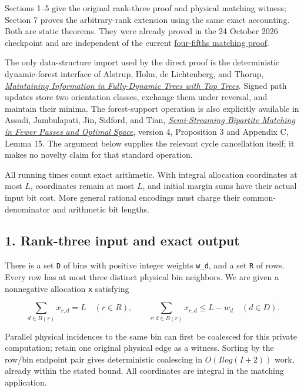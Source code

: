 Sections 1--5 give the original rank-three proof and physical matching witness; Section 7 proves the arbitrary-rank extension using the same exact accounting. Both are static theorems. They were already proved in the 24 October 2026 checkpoint and are independent of the current \href{https://github.com/icekylinx/algorithm-frontier/blob/main/problems/general-matching/proof.md}{four-fifths matching proof}.

The only data-structure import used by the direct proof is the deterministic dynamic-forest interface of Alstrup, Holm, de Lichtenberg, and Thorup, \href{https://arxiv.org/abs/cs/0310065}{\emph{Maintaining Information in Fully-Dynamic Trees with Top Trees}}. Signed path updates store two orientation classes, exchange them under reversal, and maintain their minima. The forest-support operation is also explicitly available in Assadi, Jambulapati, Jin, Sidford, and Tian, \href{https://arxiv.org/abs/2011.03495}{\emph{Semi-Streaming Bipartite Matching in Fewer Passes and Optimal Space}}, version 4, Proposition 3 and Appendix C, Lemma 15. The argument below supplies the relevant cycle cancellation itself; it makes no novelty claim for that standard operation.

All running times count exact arithmetic. With integral allocation coordinates at most \(L\), coordinates remain at most \(L\), and initial margin sums have their actual input bit cost. More general rational encodings must charge their common-denominator and arithmetic bit lengths.

\hypertarget{af-c467a6f0ad-rank-three-input-and-exact-output}{%
\subsection{1. Rank-three input and exact output}\label{af-c467a6f0ad-rank-three-input-and-exact-output}}

There is a set \texttt{D} of bins with positive integer weights \texttt{w\_d}, and a set \texttt{R} of rows. Every row has at most three distinct physical bin neighbors. We are given a nonnegative allocation \texttt{x} satisfying

\[
\sum_{d\in B(r)}x_{r,d}=L\quad(r\in R),\qquad
\sum_{r:d\in B(r)}x_{r,d}\le L-w_d\quad(d\in D). \tag{1}
\]

Parallel physical incidences to the same bin can first be coalesced for this private computation; retain one original physical edge as a witness. Sorting by the row/bin endpoint pair gives deterministic coalescing in \(O(I log(I+2))\) work, already within the stated bound. All coordinates are integral in the matching application.

